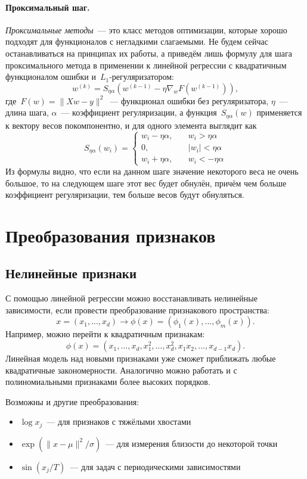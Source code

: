 \documentclass[12pt,fleqn]{article}
\begin{document}
\paragraph{Проксимальный шаг.}
\emph{Проксимальные методы}~--- это класс методов оптимизации, которые
хорошо подходят для функционалов с негладкими слагаемыми.
Не будем сейчас останавливаться на принципах их работы, а приведём лишь
формулу для шага проксимального метода в применении к линейной регрессии
с квадратичным функционалом ошибки и~$L_1$-регуляризатором:
\[
    w^{(k)}
    =
    S_{\eta \alpha} \left(
        w^{(k - 1)}
        -
        \eta
        \nabla_w F(w^{(k - 1)})
    \right),
\]
где~$F(w) = \|Xw - y\|^2$~--- функционал ошибки без регуляризатора,
$\eta$~--- длина шага,
$\alpha$~--- коэффициент регуляризации,
а функция~$S_{\eta \alpha}(w)$ применяется к вектору весов покомпонентно,
и для одного элемента выглядит как
\[
    S_{\eta \alpha} (w_i)
    =
    \begin{cases}
        w_i - \eta \alpha, \quad &w_i > \eta \alpha\\
        0, \qquad &|w_i| < \eta \alpha\\
        w_i + \eta \alpha, \quad &w_i < -\eta \alpha
    \end{cases}
\]
Из формулы видно, что если на данном шаге значение некоторого веса не очень большое,
то на следующем шаге этот вес будет обнулён, причём чем больше коэффициент регуляризации,
тем больше весов будут обнуляться.

\section{Преобразования признаков}

\subsection{Нелинейные признаки}

С помощью линейной регрессии можно восстанавливать нелинейные зависимости,
если провести преобразование признакового пространства:
\[
    x = (x_1, \dots, x_d) \to \phi(x) = (\phi_1(x), \dots, \phi_m(x)).
\]
Например, можно перейти к квадратичным признакам:
\[
    \phi(x)
    =
    (x_1, \dots, x_d, x_1^2, \dots, x_d^2, x_1 x_2, \dots, x_{d-1} x_d).
\]
Линейная модель над новыми признаками уже сможет приближать любые квадратичные закономерности.
Аналогично можно работать и с полиномиальными признаками более высоких порядков.

Возможны и другие преобразования:
\begin{itemize}
    \item $\log x_j$~--- для признаков с тяжёлыми хвостами
    \item $\exp(\|x - \mu\|^2 / \sigma)$~--- для измерения близости до некоторой точки
    \item $\sin(x_j / T)$~--- для задач с периодическими зависимостями
\end{itemize}
\end{document}
